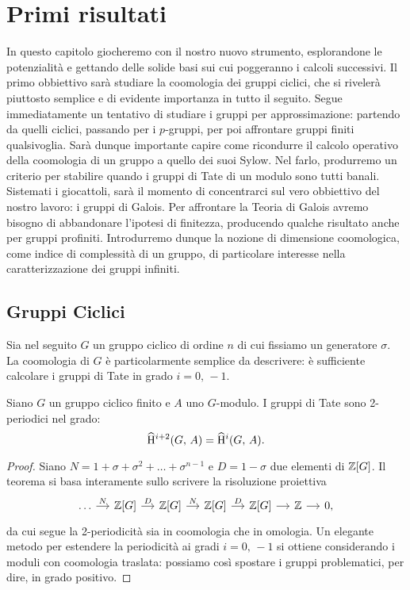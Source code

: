 \chapter{Primi risultati}
In questo capitolo giocheremo con il nostro nuovo strumento, esplorandone le potenzialità e gettando delle solide basi sui cui poggeranno i calcoli successivi. Il primo obbiettivo sarà studiare la coomologia dei gruppi ciclici, che si rivelerà piuttosto semplice e di evidente importanza in tutto il seguito. Segue immediatamente un tentativo di studiare i gruppi per approssimazione: partendo da quelli ciclici, passando per i $ p $-gruppi, per poi affrontare gruppi finiti qualsivoglia. Sarà dunque importante capire come ricondurre il calcolo operativo della coomologia di un gruppo a quello dei suoi Sylow. Nel farlo, produrremo un criterio per stabilire quando i gruppi di Tate di un modulo sono tutti banali. \\

Sistemati i giocattoli, sarà il momento di concentrarci sul vero obbiettivo del nostro lavoro: i gruppi di Galois. Per affrontare la Teoria di Galois avremo bisogno di abbandonare l'ipotesi di finitezza, producendo qualche risultato anche per gruppi profiniti. Introdurremo dunque la nozione di dimensione coomologica, come indice di complessità di un gruppo, di particolare interesse nella caratterizzazione dei gruppi infiniti.

\section{Gruppi Ciclici}
Sia nel seguito $ G $ un gruppo ciclico di ordine $ n $ di cui fissiamo un generatore $ \sigma $. La coomologia di $ G $ è particolarmente semplice da descrivere: è sufficiente calcolare i gruppi di Tate in grado $ i = 0, \, -1 $.

\begin{theorem}\label{ciclici}
	Siano $ G $ un gruppo ciclico finito e $ A $ uno $ G $-modulo. I gruppi di Tate sono 2-periodici nel grado:
	\[ \operatorname{\widehat{H}^{\mathnormal{i}+2}}(G, \, A) = \operatorname{\widehat{H}^\mathnormal{i}}(G, \, A). \]
\end{theorem}

\begin{proof}
	Siano $ N = 1 + \sigma + \sigma^2 + \dots + \sigma^{n-1} $ e $ D = 1 - \sigma $ due elementi di $ \mathbb{Z}[G] $. Il teorema si basa interamente sullo scrivere la risoluzione proiettiva
	\[ \begin{tikzcd}[column sep = small]
	\dots \rar["N"]
	& \Z[G] \rar["D"]
	& \Z[G] \rar["N"]
	& \Z[G] \rar["D"]
	& \Z[G] \rar
	& \Z \rar & 0,
	\end{tikzcd} \]
	da cui segue la 2-periodicità sia in coomologia che in omologia. Un elegante metodo per estendere la periodicità ai gradi $ i = 0, \, -1 $ si ottiene considerando i moduli con coomologia traslata: possiamo così spostare i gruppi problematici, per dire, in grado positivo. 
\end{proof}

